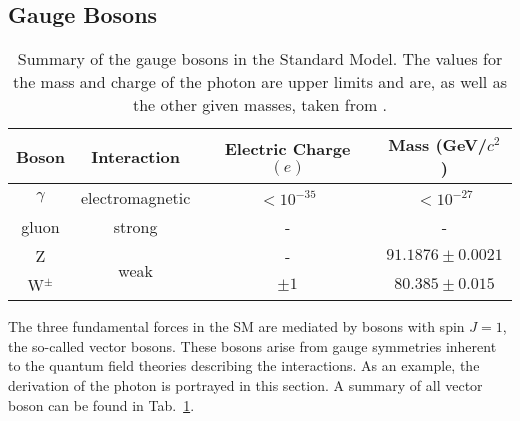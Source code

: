 \subsection{Gauge Bosons}
\label{subsec:theo:bosons}
\begin{table}[b]
	\centering
	\caption[Summary of the gauge bosons in the Standard Model]{Summary of the gauge bosons in the Standard Model. The values for the mass and charge of the photon are upper limits and are, as well as the other given masses, taken from \cite{SMmasses}.}
	\label{tab:theo:bosons}
	\begin{tabular}{cccc}
	\hline
	Boson & Interaction & Electric Charge $(e)$ & Mass (GeV/$c^2$) \\
	\hline
	$\gamma$ & electromagnetic & $<10^{-35}$ & $<10^{-27}$ \\
	gluon & strong & - & - \\
	Z & \multirow{2}{*}{weak} & - & $91.1876 \pm 0.0021$ \\
	W$^\pm$ & & $\pm 1$ & $80.385 \pm 0.015$ \\
	\hline
	\end{tabular}
\end{table}
The three fundamental forces in the SM are mediated by bosons with spin $J=1$, the so-called vector bosons. These bosons arise from gauge symmetries inherent to the quantum field theories describing the interactions. As an example, the derivation of the photon is portrayed in this section. A summary of all vector boson can be found in Tab.~\ref{tab:theo:bosons}.\\


